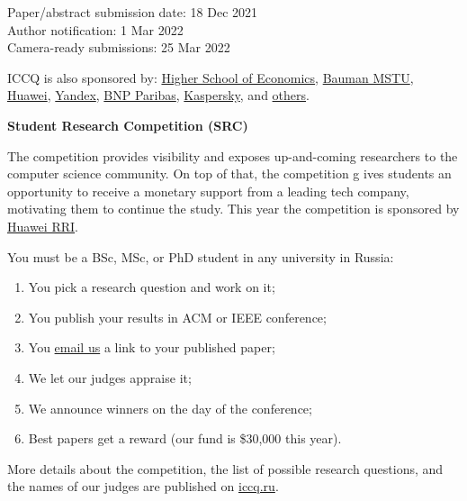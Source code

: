 \documentclass{../cfp}
\begin{document}
\begin{adjustwidth}{1.5in}{0pt}
\vspace{6pt}
Paper/abstract submission date: 18 Dec 2021 \\
Author notification: 1 Mar 2022 \\
Camera-ready submissions: 25 Mar 2022

\vspace{6pt}
ICCQ is also sponsored by:
\href{https://www.hse.ru/en/}{Higher School of Economics},
\href{https://bmstu.ru/en/}{Bauman MSTU},
\href{https://www.huawei.com/}{Huawei},
\href{https://yandex.com/company/}{Yandex},
\href{https://www.linkedin.com/company/btechrussia}{BNP Paribas},
\href{https://www.kaspersky.com/}{Kaspersky},
and \href{https://www.iccq.ru/2022.html#partners}{others}.
\end{adjustwidth}

\newpage

{\color{xred}\bfseries{\Large Student Research Competition (SRC)}}

The competition provides visibility and exposes up-and-coming
researchers to the computer science community. On top of that, the competition g
ives students an opportunity to receive a monetary support from a leading tech
company, motivating them to continue the study.
This year the competition is sponsored by \href{https://career.huawei.ru/rri/}{Huawei RRI}.

You must be a BSc, MSc, or PhD student in any university in Russia:

\begin{enumerate}
\item You pick a research question and work on it;
\item You publish your results in ACM or IEEE conference;
\item You \href{mailto:src@iccq.ru}{email us} a link to your published paper;
\item We let our judges appraise it;
\item We announce winners on the day of the conference;
\item Best papers get a reward (our fund is \$30,000 this year).
\end{enumerate}

More details about the competition, the list of possible research questions,
and the names of our judges are published on \href{https://www.iccq.ru}{iccq.ru}.

\end{document}

